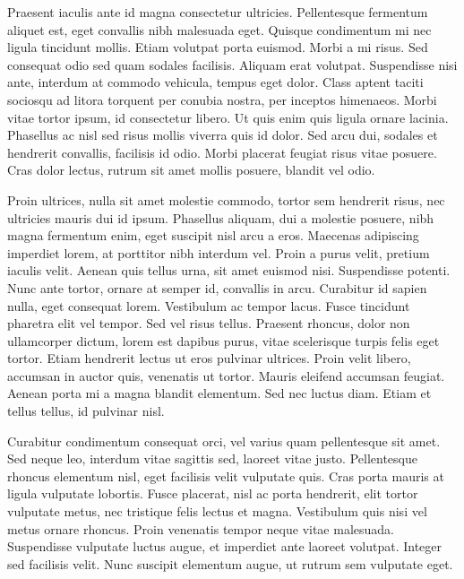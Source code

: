 Praesent iaculis ante id magna consectetur ultricies.
Pellentesque fermentum aliquet est, eget convallis nibh malesuada eget.
Quisque condimentum mi nec ligula tincidunt mollis.
Etiam volutpat porta euismod.
Morbi a mi risus.
Sed consequat odio sed quam sodales facilisis.
Aliquam erat volutpat.
Suspendisse nisi ante, interdum at commodo vehicula, tempus eget dolor.
Class aptent taciti sociosqu ad litora torquent per conubia nostra, per inceptos himenaeos.
Morbi vitae tortor ipsum, id consectetur libero.
Ut quis enim quis ligula ornare lacinia.
Phasellus ac nisl sed risus mollis viverra quis id dolor.
Sed arcu dui, sodales et hendrerit convallis, facilisis id odio.
Morbi placerat feugiat risus vitae posuere.
Cras dolor lectus, rutrum sit amet mollis posuere, blandit vel odio.

Proin ultrices, nulla sit amet molestie commodo, tortor sem hendrerit risus, nec ultricies mauris dui id ipsum.
Phasellus aliquam, dui a molestie posuere, nibh magna fermentum enim, eget suscipit nisl arcu a eros.
Maecenas adipiscing imperdiet lorem, at porttitor nibh interdum vel.
Proin a purus velit, pretium iaculis velit.
Aenean quis tellus urna, sit amet euismod nisi.
Suspendisse potenti.
Nunc ante tortor, ornare at semper id, convallis in arcu.
Curabitur id sapien nulla, eget consequat lorem.
Vestibulum ac tempor lacus.
Fusce tincidunt pharetra elit vel tempor.
Sed vel risus tellus.
Praesent rhoncus, dolor non ullamcorper dictum, lorem est dapibus purus, vitae scelerisque turpis felis eget tortor.
Etiam hendrerit lectus ut eros pulvinar ultrices.
Proin velit libero, accumsan in auctor quis, venenatis ut tortor.
Mauris eleifend accumsan feugiat.
Aenean porta mi a magna blandit elementum.
Sed nec luctus diam.
Etiam et tellus tellus, id pulvinar nisl.

Curabitur condimentum consequat orci, vel varius quam pellentesque sit amet.
Sed neque leo, interdum vitae sagittis sed, laoreet vitae justo.
Pellentesque rhoncus elementum nisl, eget facilisis velit vulputate quis.
Cras porta mauris at ligula vulputate lobortis.
Fusce placerat, nisl ac porta hendrerit, elit tortor vulputate metus, nec tristique felis lectus et magna.
Vestibulum quis nisi vel metus ornare rhoncus.
Proin venenatis tempor neque vitae malesuada.
Suspendisse vulputate luctus augue, et imperdiet ante laoreet volutpat.
Integer sed facilisis velit.
Nunc suscipit elementum augue, ut rutrum sem vulputate eget.

